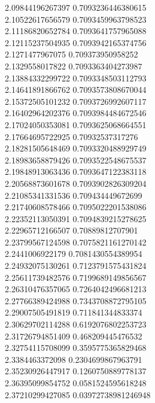 {2.09844196267397 0.7093236446380615 \\
2.10522617656579 0.7093459963798523 \\
2.11186820652784 0.7093641757965088 \\
2.12115237504935 0.7093942165374756 \\
2.1271477967075 0.709373950958252 \\
2.1329558017822 0.7093363404273987 \\
2.13884332299722 0.7093348503112793 \\
2.14641891866762 0.7093573808670044 \\
2.15372505101232 0.7093726992607117 \\
2.16402964202376 0.7093984484672546 \\
2.17024050353081 0.7093625068664551 \\
2.17664695722925 0.70932537317276 \\
2.18281505648469 0.7093320488929749 \\
2.18983658879426 0.7093522548675537 \\
2.19848913063436 0.7093647122383118 \\
2.20568873601678 0.7093902826309204 \\
2.21085341331536 0.709434449672699 \\
2.21740608578466 0.7095022201538086 \\
2.22352113050391 0.7094839215278625 \\
2.22965712166507 0.70889812707901 \\
2.23799567124598 0.7075821161270142 \\
2.2441006922179 0.7081430554389954 \\
2.24932075130261 0.7123791575431824 \\
2.25611739482576 0.7199689149856567 \\
2.26310476357065 0.7264042496681213 \\
2.27766389424988 0.7343708872795105 \\
2.29007505491819 0.711841344833374 \\
2.30629702114288 0.6192076802253723 \\
2.31726794851409 0.468209445476532 \\
2.32754115708099 0.3595775365829468 \\
2.3384463372098 0.2304699867963791 \\
2.35230926447917 0.1260750889778137 \\
2.36395099854752 0.0581524595618248 \\
2.37210299427085 0.03972738981246948 \\
}
